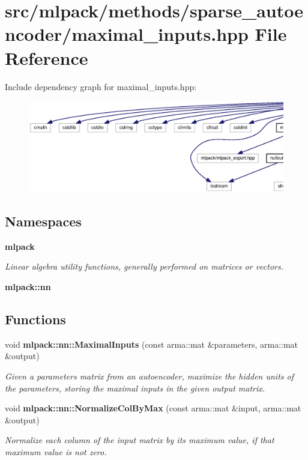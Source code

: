 \section{src/mlpack/methods/sparse\+\_\+autoencoder/maximal\+\_\+inputs.hpp File Reference}
\label{maximal__inputs_8hpp}
Include dependency graph for maximal\+\_\+inputs.\+hpp\+:
\nopagebreak
\begin{figure}[H]
\begin{center}
\leavevmode
\includegraphics[width=350pt]{maximal__inputs_8hpp__incl}
\end{center}
\end{figure}
\subsection*{Namespaces}
\begin{DoxyCompactItemize}
\item 
 {\bf mlpack}
\begin{DoxyCompactList}\small\item\em Linear algebra utility functions, generally performed on matrices or vectors. \end{DoxyCompactList}\item 
 {\bf mlpack\+::nn}
\end{DoxyCompactItemize}
\subsection*{Functions}
\begin{DoxyCompactItemize}
\item 
void {\bf mlpack\+::nn\+::\+Maximal\+Inputs} (const arma\+::mat \&parameters, arma\+::mat \&output)
\begin{DoxyCompactList}\small\item\em Given a parameters matrix from an autoencoder, maximize the hidden units of the parameters, storing the maximal inputs in the given output matrix. \end{DoxyCompactList}\item 
void {\bf mlpack\+::nn\+::\+Normalize\+Col\+By\+Max} (const arma\+::mat \&input, arma\+::mat \&output)
\begin{DoxyCompactList}\small\item\em Normalize each column of the input matrix by its maximum value, if that maximum value is not zero. \end{DoxyCompactList}\end{DoxyCompactItemize}


